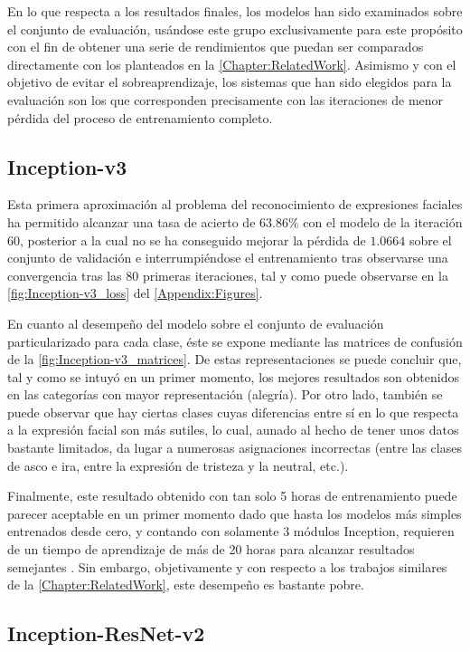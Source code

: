En lo que respecta a los resultados finales, los modelos han sido examinados sobre el conjunto de evaluación, usándose este grupo exclusivamente para este propósito con el fin de obtener una serie de rendimientos que puedan ser comparados directamente con los planteados en la \autoref{Chapter:RelatedWork}. Asimismo y con el objetivo de evitar el sobreaprendizaje, los sistemas que han sido elegidos para la evaluación son los que corresponden precisamente con las iteraciones de menor pérdida del proceso de entrenamiento completo.

\subsection{Inception-v3}

Esta primera aproximación al problema del reconocimiento de expresiones faciales ha permitido alcanzar una tasa de acierto de $63.86\%$ con el modelo de la iteración $60$, posterior a la cual no se ha conseguido mejorar la pérdida de $1.0664$ sobre el conjunto de validación e interrumpiéndose el entrenamiento tras observarse una convergencia tras las 80 primeras iteraciones, tal y como puede observarse en la \autoref{fig:Inception-v3_loss} del \autoref{Appendix:Figures}.

En cuanto al desempeño del modelo sobre el conjunto de evaluación particularizado para cada clase, éste se expone mediante las matrices de confusión de la \autoref{fig:Inception-v3_matrices}. De estas representaciones se puede concluir que, tal y como se intuyó en un primer momento, los mejores resultados son obtenidos en las categorías con mayor representación (alegría). Por otro lado, también se puede observar que hay ciertas clases cuyas diferencias entre sí en lo que respecta a la expresión facial son más sutiles, lo cual, aunado al hecho de tener unos datos bastante limitados, da lugar a numerosas asignaciones incorrectas (entre las clases de asco e ira, entre la expresión de tristeza y la neutral, etc.).

Finalmente, este resultado obtenido con tan solo 5 horas de entrenamiento puede parecer aceptable en un primer momento dado que hasta los modelos más simples entrenados desde cero, y contando con solamente 3 módulos Inception, requieren de un tiempo de aprendizaje de más de 20 horas para alcanzar resultados semejantes \cite{FERTime}. Sin embargo, objetivamente y con respecto a los trabajos similares de la \autoref{Chapter:RelatedWork}, este desempeño es bastante pobre.

\subsection{Inception-ResNet-v2}

